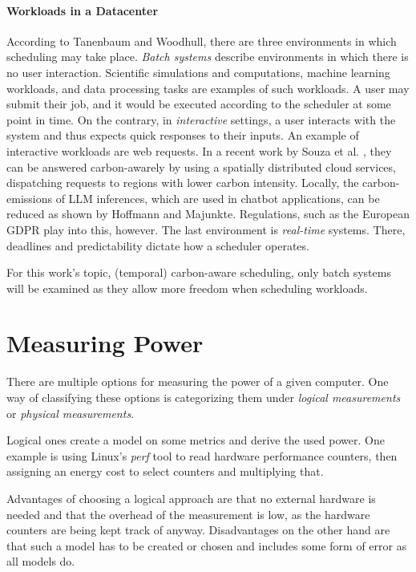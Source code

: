 \paragraph{Workloads in a Datacenter} According to Tanenbaum and Woodhull\cite{tanenbaum_operating_2006}, there are three environments in which scheduling may take place. \emph{Batch systems} describe environments in which there is no user interaction. 
Scientific simulations and computations, machine learning workloads, and data processing tasks are examples of such workloads\cite{sukprasert_limitations_2024}. 
A user may submit their job, and it would be executed according to the scheduler at some point in time. 
On the contrary, in \emph{interactive} settings, a user interacts with the system and thus expects quick responses to their inputs. An example of interactive workloads are web requests. In a recent work by Souza et al. \cite{souza_casper_2024}, they can be answered carbon-awarely by using a spatially distributed cloud services, dispatching requests to regions with lower carbon intensity. Locally, the carbon-emissions of LLM inferences, which are used in chatbot applications, can be reduced as shown by Hoffmann and Majunkte\cite{hoffmann_improving_2024}. Regulations, such as the European GDPR play into this, however.
The last environment is \emph{real-time} systems. There, deadlines and predictability dictate how a scheduler operates.

For this work's topic, (temporal) carbon-aware scheduling, only batch systems will be examined as they allow more freedom when scheduling workloads.

\section{Measuring Power}

There are multiple options for measuring the power of a given computer. One way of classifying these options is categorizing them under \emph{logical measurements} or \emph{physical measurements}.

Logical ones create a model on some metrics and derive the used power. One example is using Linux's \emph{perf} tool to read hardware performance counters, then assigning an energy cost to select counters and multiplying that. 

Advantages of choosing a logical approach are that no external hardware is needed and that the overhead of the measurement is low, as the hardware counters are being kept track of anyway. 
Disadvantages on the other hand are that such a model has to be created or chosen and includes some form of error as all models do.

